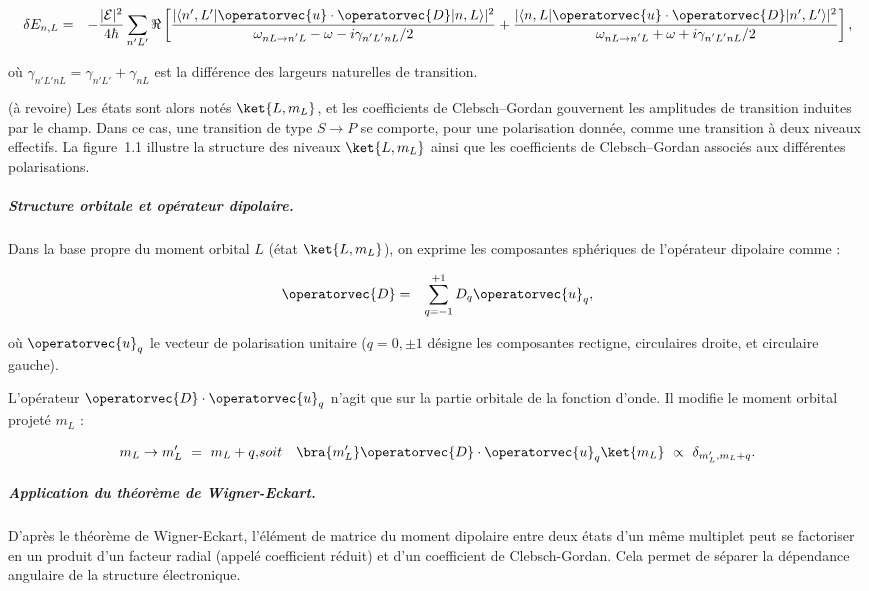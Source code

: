 \begin{eqnarray}
	\delta E_{n,L} & = & -\frac{|\mathcal{E}|^2}{4\hbar} \sum_{n'L'} \Re\left[
		\frac{|\langle n',L'|\operatorvec{u} \cdot \operatorvec{D}|n,L\rangle|^2}{\omega_{\scriptstyle nL \rightarrow n'L} - \omega - i\gamma_{\scriptstyle n'L'nL}/2}
		+
		\frac{|\langle n,L|\operatorvec{u} \cdot \operatorvec{D}|n',L'\rangle|^2}{\omega_{\scriptstyle nL \rightarrow n'L} + \omega + i\gamma_{\scriptstyle n'L'nL}/2}
	\right],\label{chap:dipolaire:eq:nrj2.2}
\end{eqnarray}

où $\gamma_{\scriptstyle  n'L'nL} = \gamma_{n'L'} + \gamma_{nL}$ est la différence des largeurs naturelles de transition.

{\color{red} (à revoire)} Les états sont alors notés $\ket{L, m_L}$, et les coefficients de Clebsch–Gordan gouvernent les amplitudes de transition induites par le champ.
Dans ce cas, une transition de type $S \rightarrow P$ se comporte, pour une polarisation donnée, comme une transition à deux niveaux effectifs. La figure~1.1 illustre la structure des niveaux $\ket{L, m_L}$ ainsi que les coefficients de Clebsch–Gordan associés aux différentes polarisations.

\subparagraph{Structure orbitale et opérateur dipolaire.}

Dans la base propre du moment orbital $L$ (état $\ket{L, m_L}$), on exprime les composantes sphériques de l’opérateur dipolaire comme :

\begin{eqnarray*}
	\operatorvec{D} & = & \sum_{q=-1}^{+1} D_q \operatorvec{u}_q,
\end{eqnarray*}

où $\operatorvec{u}_q$ le vecteur de polarisation unitaire ($q  = 0 , \pm 1 $ désigne les composantes rectigne,  circulaires droite,  et circulaire gauche).

L'opérateur $\operatorvec{D} \cdot \operatorvec{u}_q$ n’agit que sur la partie orbitale de la fonction d’onde. Il modifie le moment orbital projeté $m_L$ :

\begin{eqnarray*}
	m_L \to m_L' ~=~ m_L + q ,   & soit &\bra{m_L'} \operatorvec{D} \cdot \operatorvec{u}_q \ket{m_L} ~ \propto ~ \delta_{m_L', m_L + q}.
\end{eqnarray*}

\subparagraph{Application du théorème de Wigner-Eckart.}

D’après le théorème de Wigner-Eckart, l’élément de matrice du moment dipolaire entre deux états d’un même multiplet peut se factoriser en un produit d’un facteur radial (appelé coefficient réduit) et d’un coefficient de Clebsch-Gordan. Cela permet de séparer la dépendance angulaire de la structure électronique.

